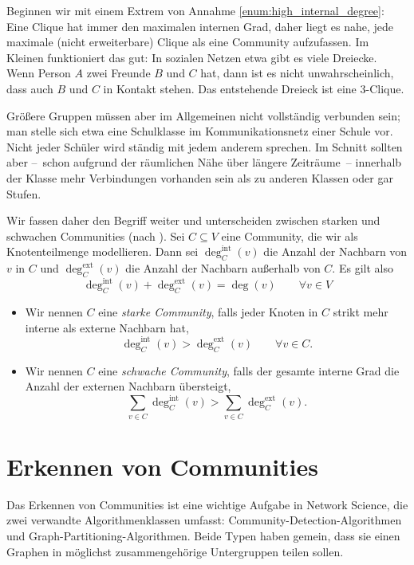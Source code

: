 Beginnen wir mit einem Extrem von Annahme \ref{enum:high_internal_degree}:
Eine Clique hat immer den maximalen internen Grad, daher liegt es nahe, jede maximale (\dh nicht erweiterbare) Clique als eine Community aufzufassen.
Im Kleinen funktioniert das gut: In sozialen Netzen etwa gibt es viele Dreiecke.
Wenn Person $A$ zwei Freunde $B$ und $C$ hat, dann ist es nicht unwahrscheinlich, dass auch $B$ und $C$ in Kontakt stehen.
Das entstehende Dreieck ist eine 3-Clique.

Größere Gruppen müssen aber im Allgemeinen nicht vollständig verbunden sein;
man stelle sich etwa eine Schulklasse im Kommunikationsnetz einer Schule vor.
Nicht jeder Schüler wird ständig mit jedem anderem sprechen.
Im Schnitt sollten aber --~schon aufgrund der räumlichen Nähe über längere Zeiträume~-- innerhalb der Klasse mehr Verbindungen vorhanden sein als zu anderen Klassen oder gar Stufen.

\def\intdeg{\deg^{\text{int}}_C}
\def\extdeg{\deg^{\text{ext}}_C}

Wir fassen daher den Begriff weiter und unterscheiden zwischen starken und schwachen Communities (nach \cite{barabasi2014network}).
Sei $C \subseteq V$ eine Community, die wir als Knotenteilmenge modellieren.
Dann sei $\intdeg(v)$ die Anzahl der Nachbarn von $v$ in $C$ und $\extdeg(v)$ die Anzahl der Nachbarn außerhalb von $C$.
Es gilt also
\begin{equation}
    \intdeg(v) + \extdeg(v) = \deg(v) \qquad \forall v \in V
\end{equation}

\begin{itemize}
    \item Wir nennen $C$ eine \emph{starke Community}, falls jeder Knoten in $C$ strikt mehr interne als externe Nachbarn hat, \dh
          \begin{equation}
              \intdeg(v) > \extdeg(v) \qquad \forall v \in C.
          \end{equation}

    \item Wir nennen $C$ eine \emph{schwache Community}, falls der gesamte interne Grad die Anzahl der externen Nachbarn übersteigt, \dh
          \begin{equation}
              \sum_{v\in C}\intdeg(v) > \sum_{v\in C} \extdeg(v).
          \end{equation}
\end{itemize}

\section{Erkennen von Communities}
Das Erkennen von Communities ist eine wichtige Aufgabe in Network Science, die zwei verwandte Algorithmenklassen umfasst:
Community-Detection-Algorithmen und Graph-Partitioning-Algorithmen.
Beide Typen haben gemein, dass sie einen Graphen in möglichst zusammengehörige Untergruppen teilen sollen.

